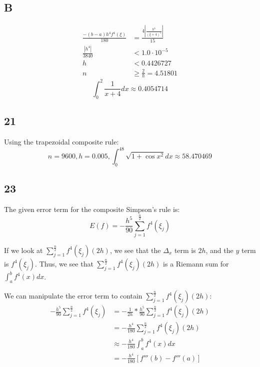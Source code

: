 \documentclass{oisinclass}
\begin{document}
\subsection*{B}
\begin{align*}
	\frac{-(b - a) h^4 f^4(\xi)}{180} & = \frac{4 \left|{\frac{h^{4}}{\left(\xi + 4\right)^{5}}}\right|}{15} \\
	\frac{\left|{h^{4}}\right|}{3840} & < 1.0 \cdot 10^{-5}                                                  \\
	h                                 & < 0.4426727                                                          \\
	n                                 & \geq \frac{2}{h} = 4.51801
\end{align*}
\[
	\int_{0}^{2}\frac{1}{x+4}dx \approx 0.4054714
\]

\subsection*{21}
Using the trapezoidal composite rule:
\[
	n = 9600, h = 0.005, \int_{0}^{48}\sqrt{1 + \cos{x}^2}dx \approx 58.470469
\]

\subsection*{23}
The given error term for the composite Simpson's rule is:
\[
	E(f) = -\frac{h^5}{90}\sum_{j=1}^{\frac{n}{2}}f^4(\xi_j)
\]

If we look at \(\sum_{j=1}^{\frac{n}{2}}f^4(\xi_j)(2h)\), we see that the \(\Delta_{x}\) term is \(2h\), and the \(y\) term is \(f^4(\xi_j)\). Thus, we see that \(\sum_{j=1}^{\frac{n}{2}}f^4(\xi_j)(2h)\) is a Riemann sum for \(\int_{a}^{b}f^4(x)dx\).

We can manipulate the error term to contain  \(\sum_{j=1}^{\frac{n}{2}}f^4(\xi_j)(2h)\):
\begin{align*}
	-\frac{h^5}{90}\sum_{j=1}^{\frac{n}{2}}f^4(\xi_j) & = -\frac{1}{2h}*\frac{h^5}{90}\sum_{j=1}^{\frac{n}{2}}f^4(\xi_j)(2h) \\
	                                                  & = -\frac{h^4}{180}\sum_{j=1}^{\frac{n}{2}}f^4(\xi_j)(2h)             \\
	                                                  & \approx -\frac{h^4}{180}\int_{a}^{b}f^4(x)dx                         \\
	                                                  & = -\frac{h^4}{180}\left[f'''(b) - f'''(a)\right]
\end{align*}
\end{document}
